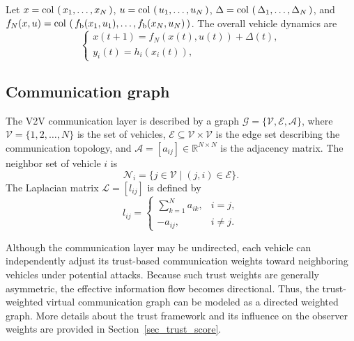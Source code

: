 \documentclass[journal,twoside]{IEEEtran}
\def\col#1{\mathop{{\rm col}\,\left(\,#1\,\right)}}
\def\V{\mathcal{V}} %
\def\E{\mathcal{E}} %
\def\G{\mathcal{G}} %
\def\A{\mathcal{A}} %
\def\L{\mathcal{L}} %
\def\N{\mathcal{N}} %
\begin{document}
Let $x=\col{x_1,\ldots,x_N}$, $u=\col{u_1,\ldots,u_N}$, $\Delta=\col{\Delta_1,\ldots,\Delta_N}$, and $f_N(x,u)=\col{f_{\text{b}}(x_1,u_1),\ldots,f_{\text{b}}(x_N,u_N)}$. The overall vehicle dynamics are
\begin{equation}\label{eq_platoon}
\left\{
\begin{array}{l}
      x(t+1)=f_N(x(t),u(t))+\Delta(t),\\
      y_i(t)=h_i(x_i(t)),
\end{array}
\right.
\end{equation}

\subsection{Communication graph}
The V2V communication layer is described by a graph $\G=\{\V,\E,\A\}$, where $\V=\{1,2,\ldots,N\}$ is the set of vehicles, $\E\subseteq\V\times\V$ is the edge set describing the communication topology, and $\A=[a_{ij}]\in\mathbb{R}^{N\times N}$ is the adjacency matrix. The neighbor set of vehicle $i$ is
\begin{equation}
    \N_i=\{j\in\V\mid (j,i)\in\E\}.
\end{equation}
The Laplacian matrix $\L=[l_{ij}]$ is defined by
\begin{equation}
    l_{ij}=\begin{cases}
        \sum_{k=1}^{N}a_{ik}, & i=j,\\
        -a_{ij}, & i\neq j.
    \end{cases}
\end{equation}

Although the communication layer may be undirected, each vehicle can independently adjust its trust-based communication weights toward neighboring vehicles under potential attacks. Because such trust weights are generally asymmetric, the effective information flow becomes directional. Thus, the trust-weighted virtual communication graph can be modeled as a directed weighted graph. More details about the trust framework and its influence on the observer weights are provided in Section~\ref{sec_trust_score}. 
\end{document}
